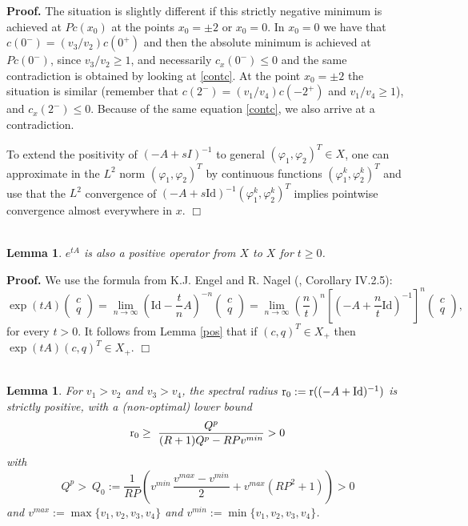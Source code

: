 \documentclass[a4paper]{article}
\newtheorem{lemma}[thm]{Lemma}
\def\Id{\rm{Id}}
\def\r{{\rm{r}}}
\def\Id{\mathrm{Id}}
\numberwithin{equation}{section}
\newenvironment{pf}{\vspace{0.5em}\noindent\textbf{Proof.} }{\quad \hfill $\Box$ \\ \vspace{0.2em}\\}
\begin{document}
\begin{pf}
The situation is slightly different if this strictly negative minimum is achieved at $Pc(x_0)$ at the points $x_0=\pm2$ or $x_0=0$. In $x_0=0$ we have that $c(0^-)=(v_3/v_2)c(0^+)$ and then the absolute minimum is achieved at $Pc(0^-)$, since $v_3/v_2\ge 1$, and necessarily $c_x(0^-)\le 0$ and the same contradiction is obtained by looking at \eqref{contc}. At the point $x_0=\pm2$ the situation is similar (remember that $c(2^-)= (v_1/v_4) c(-2^+)$  and $v_1/v_4\ge1$), and $c_x(2^-)\le 0$. Because of the same equation \eqref{contc}, we also arrive at a contradiction.

To extend the positivity of $(-A+sI)^{-1}$ to general $(\varphi_1,\varphi_2)^T\in X$, one can approximate in the $L^2$ norm $(\varphi_1,\varphi_2)^T$ by continuous functions $(\varphi_1^k,\varphi_2^k)^T$ and use that the $L^2$ convergence of
$(-A+s\Id)^{-1}(\varphi_1^k,\varphi_2^k)^T$ implies pointwise convergence almost everywhere in $x$.
\end{pf}
\begin{lemma}\label{lem:posop}
$e^{tA}$ is also a positive operator from $X$ to $X$ for $t\geq 0$.
\end{lemma}
\begin{pf}
We use the formula from K.J. Engel and R. Nagel (\cite{EngelNagel}, Corollary IV.2.5):
$$\exp(tA)\begin{pmatrix}c\\q\end{pmatrix}=\lim_{n\to\infty}\left(\Id-\dfrac{t}{n}A\right)^{-n}\begin{pmatrix}c\\q\end{pmatrix}=
\lim_{n\to\infty}\left(\dfrac{n}{t}\right)^{n}\left[\left(-A+\dfrac{n}{t}\Id\right)^{-1}\right]^n\begin{pmatrix}c\\q\end{pmatrix},
$$
for every $t>0$. It follows from Lemma \ref{pos} that if $(c,q)^T\in X_+$ then $\exp(tA)(c,q)^T\in X_+$.
\end{pf}
\begin{lemma}
For $v_1>v_2$ and $v_3>v_4$, the spectral radius $\r_0:=\r((-A+\Id)^{-1})$ is strictly positive, with a (non-optimal) lower bound
\begin{equation*}%
\r_0 \geq \ \dfrac{Q^p}{(R+1)Q^p-RP v^{min}} >0
\end{equation*}
with
\begin{equation}\label{eq:Qp}
 Q^p > \  Q_0 :=\dfrac{1 }{RP}\left(v^{min} \,\dfrac{v^{max}-v^{min}}{2}+v^{max}\left(RP^2+1\right)  \right)  >0
\end{equation}
and $v^{max}:=\max\{v_1,v_2,v_3, v_4\}$ and $v^{min}:=\min\{v_1,v_2,v_3, v_4\}$.
\end{lemma}
\end{document}
